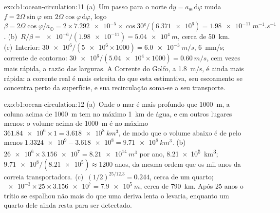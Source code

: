 \begin{solution}{exo:b1:ocean-circulation:11}
(a)~Um passo para o norte $\mathrm dy = a_\oplus\,\mathrm d\varphi$ muda $f = 2\Omega
\sin\varphi$ em $2\Omega\cos\varphi\,\mathrm d\varphi$, logo $\beta = 2\Omega
\cos\varphi/a_\oplus = 2 \times \num{7.292e-5} \times \cos\ang{30}/(\num{6.371e6}) =
\qty{1.98e-11}{m^{-1}.s^{-1}}$. (b)~$R/\beta = \num{e-6}/(\num{1.98e-11}) =
\qty{5.04e4}{m}$, cerca de \qty{50}{km}. (c)~Interior: $\num{30e6}/(\num{5e6} \times
1000) = \qty{6.0e-3}{m/s}$, \qty{6}{mm/s}; corrente de contorno: $\num{30e6}/(\num{5.04e4}
\times 1000) = \qty{0.60}{m/s}$, cem vezes mais rápida, a razão das larguras. A
Corrente do Golfo, a \qty{1.8}{m/s}, é ainda mais rápida: a corrente real é mais estreita
do que esta estimativa, seu escoamento se concentra perto da superfície, e sua recirculação soma-se
a seu transporte.
\end{solution}

\begin{solution}{exo:b1:ocean-circulation:12}
(a)~Onde o mar é mais profundo que \qty{1000}{m}, a coluna acima de \qty{1000}{m}
tem no máximo \qty{1}{km} de água, e em outros lugares menos: o volume acima de
\qty{1000}{m} é no máximo $\num{361.84e6} \times 1 = \qty{3.618e8}{km^3}$, de modo que o
volume abaixo é de pelo menos $\num{1.3324e9} - \num{3.618e8} = \qty{9.71e8}{km^3}$.
(b)~$\num{26e6} \times \num{3.156e7} = \qty{8.21e14}{m^3}$ por ano,
\qty{8.21e5}{km^3}; $\num{9.71e8}/(\num{8.21e5}) \approx 1200$ anos, da mesma ordem que
os mil anos da correia transportadora. (c)~$(1/2)^{25/12.3} = 0.244$, cerca de um quarto;
$\num{e-3} \times 25 \times \num{3.156e7} = \qty{7.9e5}{m}$, cerca de \qty{790}{km}.
Após 25 anos o trítio se espalhou não mais do que uma deriva lenta o levaria,
enquanto um quarto dele ainda resta para ser detectado.
\end{solution}

